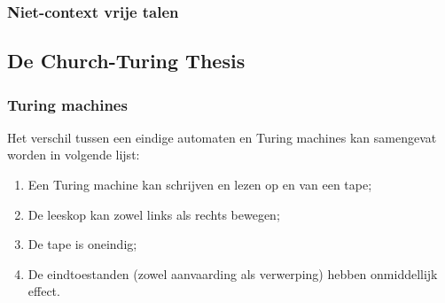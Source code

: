 \documentclass[12pt,a4paper]{article}
\theoremstyle{definition}
\begin{document}
	\subsubsection{Niet-context vrije talen}
	\subsection{De Church-Turing Thesis}
	
	\subsubsection{Turing machines}
	Het verschil tussen een eindige automaten en Turing machines kan samengevat worden in volgende lijst:\begin{enumerate}
		\item Een Turing machine kan schrijven en lezen op en van een tape;
		\item De leeskop kan zowel links als rechts bewegen;
		\item De tape is oneindig;
		\item De eindtoestanden (zowel aanvaarding als verwerping) hebben onmiddellijk effect.
	\end{enumerate}
	\newpage
	\listoftodos	
\end{document}
